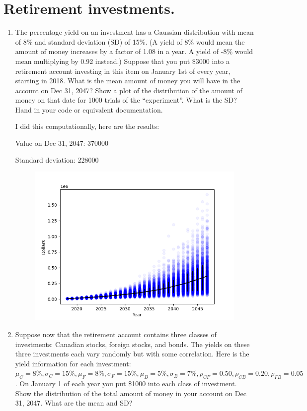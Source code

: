 \section{Retirement investments.}

\begin{enumerate}[label=\textbf{\Alph*}.]

    \item The percentage yield on an investment has a Gaussian distribution with mean of 8\% and standard deviation (SD) of 15\%. (A yield of 8\% would mean the amount of money increases by a factor of 1.08 in a year. A yield of -8\% would mean multiplying by 0.92 instead.) Suppose that you put \$3000 into a retirement account investing in this item on January 1st of every year, starting in 2018. What is the mean amount of money you will have in the account on Dec 31, 2047? Show a plot of the distribution of the amount of money on that date for 1000 trials of the ``experiment''. What is the SD? Hand in your code or equivalent documentation.

    I did this computationally, here are the results:

    Value on Dec 31, 2047: 370000

    Standard deviation: 228000


    \begin{figure}[H]
        \includegraphics[width=\textwidth]{q4_a.png}
    \end{figure}

    \item Suppose now that the retirement account contains three classes of investments: Canadian stocks, foreign stocks, and bonds. The yields on these three investments each vary randomly but with some correlation. Here is the yield information for each investment: $\mu_C = 8\%, \sigma_C = 15\%, \mu_F = 8\%, \sigma_F = 15\%, \mu_B = 5\%, \sigma_B = 7\%, \rho_{CF}=0.50, \rho_{CB}=0.20, \rho_{FB}=0.05$. On January 1 of each year you put \$1000 into each class of investment. Show the distribution of the total amount of money in your account on Dec 31, 2047. What are the mean and SD?


\end{enumerate}

